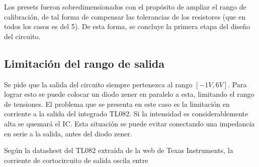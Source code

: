 Los presets fueron sobredimensionados con el prop\'osito de ampliar el rango de calibraci\'on, de tal forma de compensar las tolerancias de los resistores (que en todos los casos es del 5\percent).
 De esta forma, se concluye la primera etapa del diseño del circuito.

 \subsection{Limitaci\'on del rango de salida}

 Se pide que la salida del circuito siempre pertenezca al rango $[-1V , 6V]$. Para lograr esto se puede colocar un diodo zener en paralelo a esta, limitando el rango de tensiones.
  El problema que se presenta en este caso es la limitación en corriente a la salida del integrado TL082. Si la intensidad es considerablemente alta se quemar\'a el IC. 
  Esta situaci\'on se puede evitar conectando una impedancia en serie a la salida, antes del diodo zener.


Seg\'un la datasheet del TL082 extra\'ida de la web de Texas Instruments, la corriente de cortocircuito de salida oscila entre 